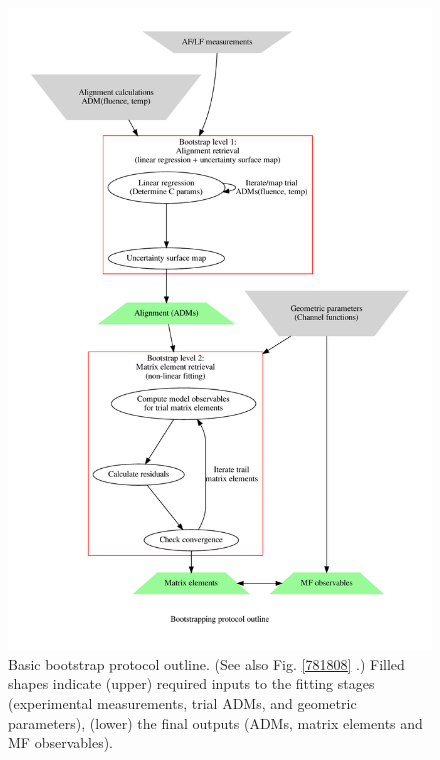 \documentclass[10pt]{article}
\begin{document}
\begin{figure}[]
\begin{center}
\includegraphics[width=\textwidth,height=\dimexpr\textheight-4\baselineskip-\abovecaptionskip-\belowcaptionskip\relax,keepaspectratio]{figures/bootstrap_flowchart_290822.gv.pdf}
\caption{Basic bootstrap protocol outline. (See also Fig. \ref{781808} .) Filled shapes indicate (upper) required inputs to the fitting stages (experimental measurements, trial ADMs, and geometric parameters), (lower) the final outputs (ADMs, matrix elements and MF observables).\label{807606}}
\end{center}
\end{figure}
\end{document}
